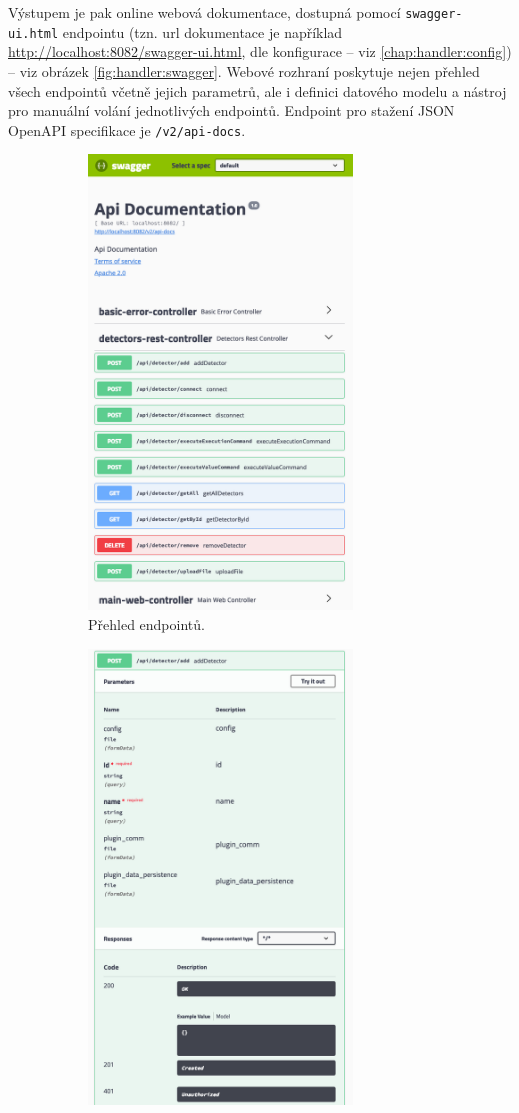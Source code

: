 Výstupem je pak online webová dokumentace, dostupná pomocí \texttt{swagger-ui.html} end\-pointu (tzn. url dokumentace je například \url{http://localhost:8082/swagger-ui.html}, dle konfigurace -- viz \ref{chap:handler:config}) -- viz obrázek \ref{fig:handler:swagger}. Webové rozhraní poskytuje nejen přehled všech endpointů včetně jejich parametrů, ale i definici datového modelu a nástroj pro manuální volání jednotlivých endpointů.
Endpoint pro stažení JSON OpenAPI specifikace je \texttt{/v2/api-docs}.

\begin{figure}[h]
	\begin{center}
    \begin{subfigure}{7.0cm}
			\includegraphics[width=7.0cm]{figures/handler_swagger_a.png}	
			\caption{Přehled endpointů.}
			\label{fig:handler:swagger_b}
		\end{subfigure}
		\hspace{0.1cm}
		\begin{subfigure}{7.0cm}
			\includegraphics[width=7.0cm]{figures/handler_swagger_b.png}

\end{subfigure}
\end{center}
\end{figure}
